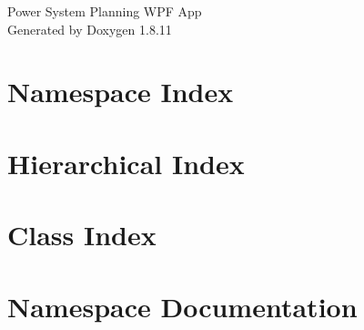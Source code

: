 \documentclass[twoside]{book}
\newcommand{\+}{\discretionary{\mbox{\scriptsize$\hookleftarrow$}}{}{}}
\newcommand{\clearemptydoublepage}{%
  \newpage{\pagestyle{empty}\cleardoublepage}%
}
\begin{document}
\hypersetup{pageanchor=false,
             bookmarksnumbered=true,
             pdfencoding=unicode
            }
\begin{titlepage}
\vspace*{7cm}
\begin{center}%
{\Large Power System Planning W\+PF App }\\
\vspace*{1cm}
{\large Generated by Doxygen 1.8.11}\\
\end{center}
\end{titlepage}
\clearemptydoublepage
\tableofcontents
\clearemptydoublepage
{}
\hypersetup{pageanchor=true}

\chapter{Namespace Index}

\chapter{Hierarchical Index}

\chapter{Class Index}

\chapter{Namespace Documentation}










\end{document}
